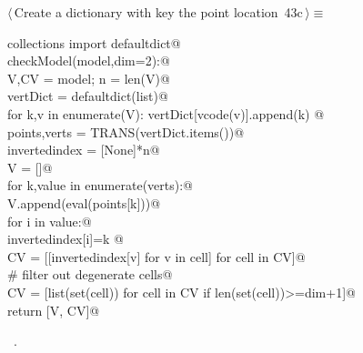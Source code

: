 \documentclass[11pt,oneside]{article}    %
\begin{document}
\begin{flushleft} \small \label{scrap72}
\protect{}$\langle\,$Create a dictionary with key the point location\nobreak\ {\footnotesize 43c}$\,\rangle\equiv$
\vspace{-1ex}
\begin{list}{}{} \item
\mbox{}\verb@from collections import defaultdict@\\
\mbox{}\verb@def checkModel(model,dim=2):@\\
\mbox{}\verb@    V,CV = model; n = len(V)@\\
\mbox{}\verb@    vertDict = defaultdict(list)@\\
\mbox{}\verb@    for k,v in enumerate(V): vertDict[vcode(v)].append(k) @\\
\mbox{}\verb@    points,verts = TRANS(vertDict.items())@\\
\mbox{}\verb@    invertedindex = [None]*n@\\
\mbox{}\verb@    V = []@\\
\mbox{}\verb@    for k,value in enumerate(verts):@\\
\mbox{}\verb@        V.append(eval(points[k]))@\\
\mbox{}\verb@        for i in value:@\\
\mbox{}\verb@            invertedindex[i]=k    @\\
\mbox{}\verb@    CV = [[invertedindex[v] for v in cell] for cell in CV]@\\
\mbox{}\verb@    # filter out degenerate cells@\\
\mbox{}\verb@    CV = [list(set(cell)) for cell in CV if len(set(cell))>=dim+1]@\\
\mbox{}\verb@    return [V, CV]@\\
\mbox{}\verb@@{\NWsep}
\end{list}
\vspace{-1ex}
\footnotesize\addtolength{\baselineskip}{-1ex}
\begin{list}{}{\setlength{\itemsep}{-\parsep}\setlength{\itemindent}{-\leftmargin}}
\item \NWtxtMacroRefIn\ .
\end{list}
\end{flushleft}
\end{document}
